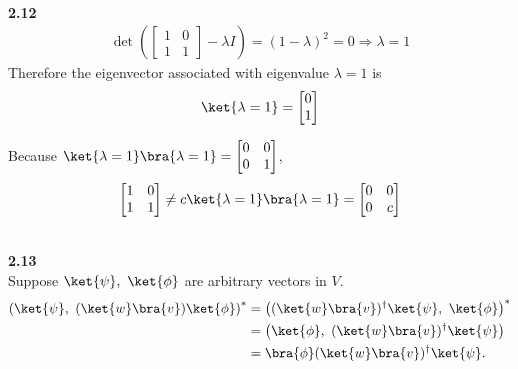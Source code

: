 \documentclass[10pt]{book}
\newcommand{\Textbf}[1]{\hspace{3mm}\\ \textbf{#1}\\}
\begin{document}
	\Textbf{2.12}
	\begin{equation}
\begin{aligned}
		\det \left(\begin{bmatrix}
			1 & 0 \\
			1 & 1
		\end{bmatrix} - \lambda I \right) = (1 - \lambda)^2 = 0 \Rightarrow \lambda = 1
	\end{aligned}
\end{equation}
	Therefore the eigenvector associated with eigenvalue $\lambda = 1$ is
	\begin{equation}
\begin{aligned}
		\ket{\lambda = 1} = \begin{bmatrix}
			0 \\
			1
		\end{bmatrix}
	\end{aligned}
\end{equation}
	
	Because $\ket{\lambda = 1}\bra{\lambda = 1} = \begin{bmatrix}
		0 & 0 \\
		0 & 1
	\end{bmatrix}$,
	\begin{equation}
\begin{aligned}
		\begin{bmatrix}
			1 & 0 \\
			1 & 1
		\end{bmatrix} \neq c\ket{\lambda = 1}\bra{\lambda = 1} = \begin{bmatrix}
			0 & 0 \\
			0 & c
		\end{bmatrix}
	\end{aligned}
\end{equation}
	
	
	
	\Textbf{2.13}
	
	Suppose $\ket{\psi},\ \ket{\phi}$ are arbitrary vectors in $V$.
	\begin{equation}
\begin{aligned}
		\left(\ket{\psi},\ (\ket{w}\bra{v}) \ket{\phi}\right)^* &=
		\left((\ket{w}\bra{v})^\dagger \ket{\psi},\  \ket{\phi}\right)^*\\
		&= \left(\ket{\phi},\ (\ket{w}\bra{v})^\dagger \ket{\psi} \right)\\
		&= \bra{\phi} (\ket{w}\bra{v})^\dagger \ket{\psi}.
	\end{aligned}
\end{equation}
	
\end{document}
